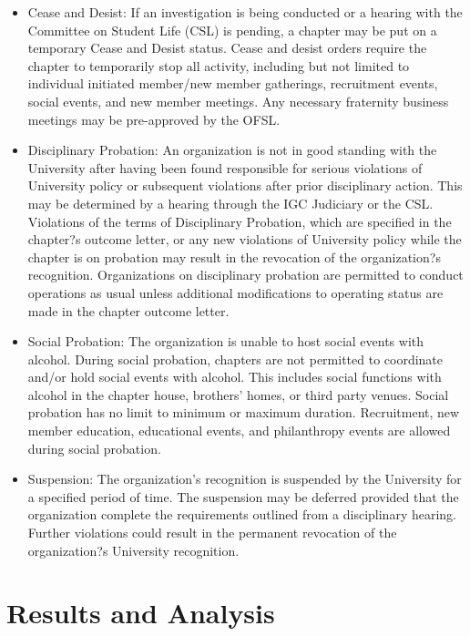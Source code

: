 \documentclass[12pt]{amsart}
\begin{document}
\begin{itemize}
  \item Cease and Desist: If an investigation is being conducted or a hearing with the Committee on Student Life (CSL) is pending, a chapter may be put on a temporary Cease and Desist status. Cease and desist orders require the chapter to temporarily stop all activity, including but not limited to individual initiated member/new member gatherings, recruitment events, social events, and new member meetings. Any necessary fraternity business meetings may be pre-approved by the OFSL.
  \item Disciplinary Probation: An organization is not in good standing with the University after having been found responsible for serious violations of University policy or subsequent violations after prior disciplinary action. This may be determined by a hearing through the IGC Judiciary or the CSL. Violations of the terms of Disciplinary Probation, which are specified in the chapter?s outcome letter, or any new violations of University policy while the chapter is on probation may result in the revocation of the organization?s recognition.  Organizations on disciplinary probation are permitted to conduct operations as usual unless additional modifications to operating status are made in the chapter outcome letter.
  \item Social Probation: The organization is unable to host social events with alcohol. During social probation, chapters are not permitted to coordinate and/or hold social events with alcohol. This includes social functions with alcohol in the chapter house, brothers' homes, or third party venues. Social probation has no limit to minimum or maximum duration. Recruitment, new member education, educational events, and philanthropy events are allowed during social probation.
  \item Suspension: The organization's recognition is suspended by the University for a specified period of time. The suspension may be deferred provided that the organization complete the requirements outlined from a disciplinary hearing. Further violations could result in the permanent revocation of the organization?s University recognition.
\end{itemize}


\section{Results and Analysis}
\end{document}
